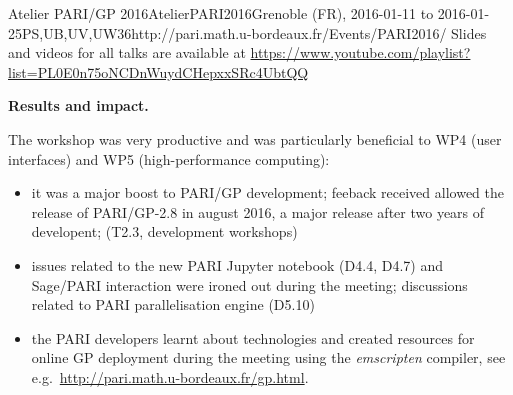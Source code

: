 \begin{event}{Atelier PARI/GP 2016}{AtelierPARI2016}{Grenoble (FR),
2016-01-11 to 2016-01-25}{PS,UB,UV,UW}{36}{http://pari.math.u-bordeaux.fr/Events/PARI2016/}
Slides and videos for all talks are available at
\url{https://www.youtube.com/playlist?list=PL0E0n75oNCDnWuydCHepxxSRc4UbtQQ}

\textbf{Results and impact.} 

The workshop was very productive and was particularly beneficial to WP4 (user
interfaces) and WP5 (high-performance computing):
\begin{itemize}
\item it was a major boost to PARI/GP development; feeback received allowed
the release of PARI/GP-2.8 in august 2016, a major release after two years of
developent; (T2.3, development workshops)

\item issues related to the new PARI Jupyter notebook (D4.4, D4.7) and
Sage/PARI interaction were ironed out during the meeting; discussions related
to PARI parallelisation engine (D5.10)

\item the PARI developers learnt about technologies and created resources for
online GP deployment during the meeting using the \emph{emscripten} compiler,
see e.g.~\url{http://pari.math.u-bordeaux.fr/gp.html}.
\end{itemize}

\end{event}
